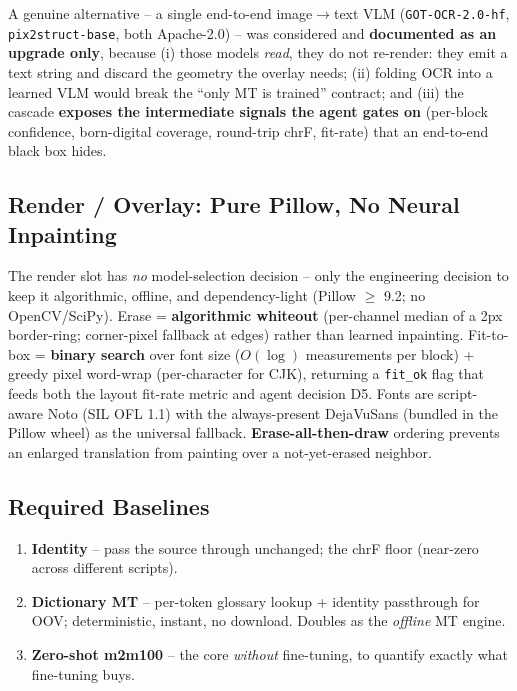 \documentclass[12pt,a4paper]{article}
\begin{document}
A genuine alternative -- a single end-to-end image$\rightarrow$text VLM (\texttt{GOT-OCR-2.0-hf}, \texttt{pix2struct-base}, both Apache-2.0) -- was considered and \textbf{documented as an upgrade only}, because (i) those models \emph{read}, they do not re-render: they emit a text string and discard the geometry the overlay needs; (ii) folding OCR into a learned VLM would break the ``only MT is trained'' contract; and (iii) the cascade \textbf{exposes the intermediate signals the agent gates on} (per-block confidence, born-digital coverage, round-trip chrF, fit-rate) that an end-to-end black box hides.

\subsection{Render / Overlay: Pure Pillow, No Neural Inpainting}

The render slot has \emph{no} model-selection decision -- only the engineering decision to keep it algorithmic, offline, and dependency-light (Pillow $\geq$ 9.2; no OpenCV/SciPy). Erase = \textbf{algorithmic whiteout} (per-channel median of a 2px border-ring; corner-pixel fallback at edges) rather than learned inpainting. Fit-to-box = \textbf{binary search} over font size ($O(\log)$ measurements per block) + greedy pixel word-wrap (per-character for CJK), returning a \texttt{fit\_ok} flag that feeds both the layout fit-rate metric and agent decision D5. Fonts are script-aware Noto (SIL OFL 1.1) with the always-present DejaVuSans (bundled in the Pillow wheel) as the universal fallback. \textbf{Erase-all-then-draw} ordering prevents an enlarged translation from painting over a not-yet-erased neighbor.

\subsection{Required Baselines}

\begin{enumerate}\setlength\itemsep{0.1em}
  \item \textbf{Identity} -- pass the source through unchanged; the chrF floor (near-zero across different scripts).
  \item \textbf{Dictionary MT} -- per-token glossary lookup + identity passthrough for OOV; deterministic, instant, no download. Doubles as the \emph{offline} MT engine.
  \item \textbf{Zero-shot m2m100} -- the core \emph{without} fine-tuning, to quantify exactly what fine-tuning buys.
\end{enumerate}
\end{document}
